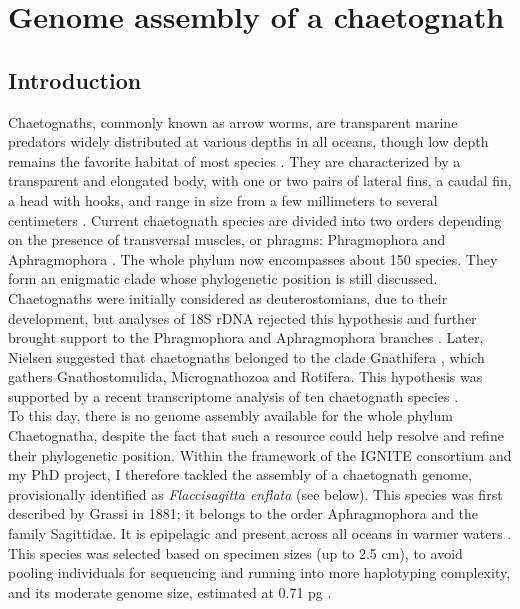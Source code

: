 
\chapter{Genome assembly of a chaetognath}

\section{Introduction}

Chaetognaths, commonly known as arrow worms, are transparent marine predators widely distributed at various depths in all oceans, though low depth remains the favorite habitat of most species  \cite{alvarino1964bathymetric}. They are characterized by a transparent and elongated body, with one or two pairs of lateral fins, a caudal fin, a head with hooks, and range in size from a few millimeters to several centimeters \cite{ghirardelli1969}. Current chaetognath species are divided into two orders depending on the presence of transversal muscles, or phragms: Phragmophora and Aphragmophora \cite{tokioka1965taxonomical}. The whole phylum now encompasses about 150 species. They form an enigmatic clade whose phylogenetic position is still discussed. Chaetognaths were initially considered as deuterostomians, due to their development, but analyses of 18S rDNA rejected this hypothesis \cite{telford1993phylogenetic,wada1994details} and further brought support to the Phragmophora and Aphragmophora branches \cite{telford1997evolution}. Later, Nielsen suggested that chaetognaths belonged to the clade Gnathifera \cite{nielsen2011}, which gathers Gnathostomulida, Micrognathozoa and Rotifera. This hypothesis was supported by a recent transcriptome analysis of ten chaetognath species \cite{marletaz2019new}.  \\

To this day, there is no genome assembly available for the whole phylum Chaetognatha, despite the fact that such a resource could help resolve and refine their phylogenetic position. Within the framework of the IGNITE consortium and my PhD project, I therefore tackled the assembly of a chaetognath genome, provisionally identified as \textit{Flaccisagitta enflata} (see below). This species was first described by Grassi in 1881; it belongs to the order Aphragmophora and the family Sagittidae. It is epipelagic and present across all oceans in warmer waters \cite{michel1984}. This species was selected based on specimen sizes (up to 2.5 cm), to avoid pooling individuals for sequencing and running into more haplotyping complexity, and its moderate genome size, estimated at 0.71 pg \cite{animal_genome_size}. \\

